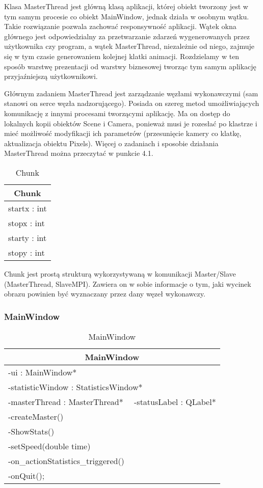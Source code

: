 Klasa MasterThread jest główną klasą aplikacji, której obiekt tworzony jest w tym samym procesie co obiekt MainWindow, jednak działa w osobnym wątku. Takie rozwiązanie pozwala zachować responsywność aplikacji. Wątek okna głównego jest odpowiedzialny za przetwarzanie zdarzeń wygenerowanych przez użytkownika czy program, a wątek MasterThread, niezależnie od niego, zajmuje się w tym czasie generowaniem kolejnej klatki animacji. Rozdzielamy w ten sposób warstwę prezentacji od warstwy biznesowej tworząc tym samym aplikację przyjaźniejszą użytkownikowi.

Głównym zadaniem MasterThread jest zarządzanie węzłami wykonawczymi (sam stanowi on serce węzła nadzorującego). Posiada on szereg metod umożliwiających komunikację z innymi procesami tworzącymi aplikację. Ma on dostęp do lokalnych kopii obiektów Scene i Camera, ponieważ musi je rozesłać po klastrze i mieć możliwość modyfikacji ich parametrów (przesunięcie kamery co klatkę, aktualizacja obiektu Pixels). Więcej o zadaniach i sposobie działania MasterThread można przeczytać w punkcie 4.1.

\footnotesize
\begin{longtable}{|p{14cm}|}
    \caption{Chunk} \label{tab:Chunk (struktura} \\ \hline
    \multicolumn{1}{|c|}{Chunk} \\ \hline
    startx : int \\
    stopx : int \\
    starty : int \\
    stopy : int \\
    \hline
\end{longtable}
\normalsize

Chunk jest prostą strukturą wykorzystywaną w komunikacji Master/Slave (MasterThread, SlaveMPI). Zawiera on w sobie informacje o tym, jaki wycinek obrazu powinien być wyznaczany przez dany węzeł wykonawczy.

\subsubsection{MainWindow}

\footnotesize
\begin{longtable}{|p{14cm}|}
    \caption{MainWindow} \label{tab:MainWindow} \\ \hline
    \multicolumn{1}{|c|}{MainWindow} \\ \hline
    -ui : MainWindow* \\
    -statisticWindow : StatisticsWindow* \\
    -masterThread : MasterThread* \ \
    -statusLabel : QLabel* \\ \hline
    -createMaster() \\
    -ShowStats() \\
    -setSpeed(double time) \\
    -on\_actionStatistics\_triggered() \\
    -onQuit(); \\ \hline
\end{longtable}
\normalsize

